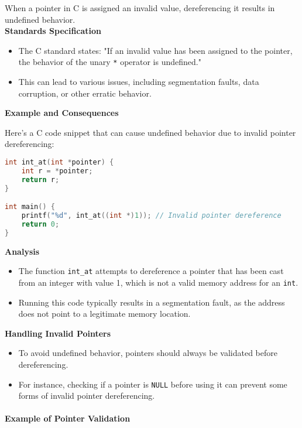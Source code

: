\documentclass[12pt]{article}
\begin{document}
When a pointer in C is assigned an invalid value, dereferencing it results in undefined behavior.\\

\textbf{Standards Specification}
\begin{itemize}
    \item The C standard states: "If an invalid value has been assigned to the pointer, the behavior of the unary \texttt{*} operator is undefined."
    \item This can lead to various issues, including segmentation faults, data corruption, or other erratic behavior.
\end{itemize}

\textbf{Example and Consequences}

Here's a C code snippet that can cause undefined behavior due to invalid pointer dereferencing:

\begin{lstlisting}[language=C]
int int_at(int *pointer) {
    int r = *pointer;
    return r;
}

int main() {
    printf("%d", int_at((int *)1)); // Invalid pointer dereference
    return 0;
}
\end{lstlisting}

\textbf{Analysis}
\begin{itemize}
    \item The function \texttt{int\_at} attempts to dereference a pointer that has been cast from an integer with value 1, which is not a valid memory address for an \texttt{int}.
    \item Running this code typically results in a segmentation fault, as the address does not point to a legitimate memory location.
\end{itemize}

\textbf{Handling Invalid Pointers}

\begin{itemize}
    \item To avoid undefined behavior, pointers should always be validated before dereferencing.
    \item For instance, checking if a pointer is \texttt{NULL} before using it can prevent some forms of invalid pointer dereferencing.
\end{itemize}

\paragraph{Example of Pointer Validation}
\end{document}

